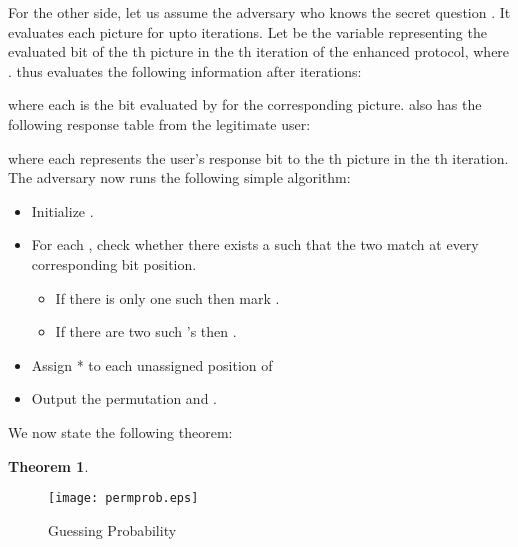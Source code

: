 \documentclass{llncs}
\begin{document}
For the other side, let us assume the adversary  who knows the secret question . It evaluates each picture for upto  iterations. Let  be the variable representing the evaluated bit of the th picture in 
the th iteration of the enhanced protocol, where .  thus evaluates the following information after  iterations:

where each  is the bit evaluated by  for the corresponding picture.  also has the following response table from the legitimate user:

where each  represents the user's response bit to the th picture in the th iteration. The adversary now runs the following simple algorithm:

\begin{itemize}
\item Initialize .
\item For each , check whether there exists a  such that the two match at every corresponding bit position.
	\begin{itemize}
\item If there is only one such  then mark .
	\item If there are two such 's then .
	\end{itemize}
\item Assign * to each unassigned position of  
\item Output the permutation  and .
\end{itemize}
We now state the following theorem:\\
\newtheorem{theo}{Theorem}
\begin{theo}



\end{theo}
\begin{figure}[ht]
\centerline{\texttt{[image: permprob.eps]}}
\caption{Guessing Probability}
\label{fig1}
\end{figure}
\end{document}
